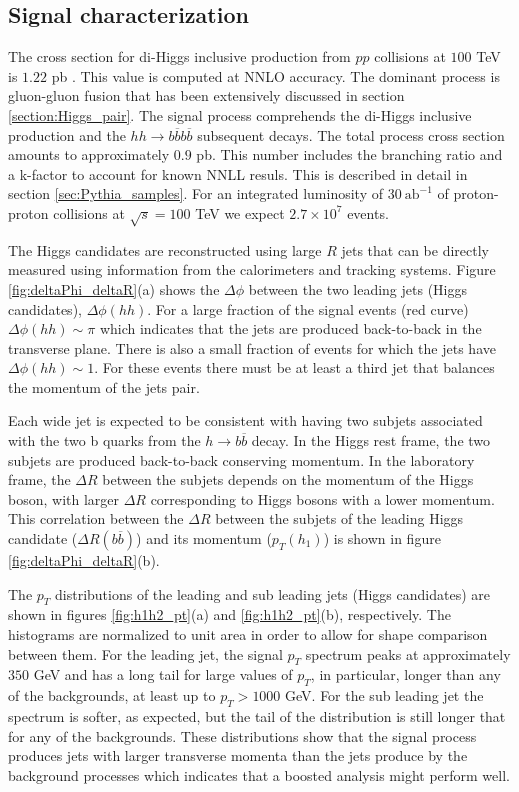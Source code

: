 \subsection{Signal characterization}

The cross section for di-Higgs inclusive production from $pp$ collisions at $100$ TeV is $1.22$ pb \cite{HxsNNLO}. This value is computed at NNLO accuracy. The dominant process is gluon-gluon fusion that has been extensively discussed in section \ref{section:Higgs_pair}. The signal process comprehends the di-Higgs inclusive production and the $hh\rightarrow b\overline{b}b\overline{b}$ subsequent decays. The total process cross section amounts to approximately $0.9$ pb. This number includes the branching ratio and a k-factor to account for known NNLL resuls. This is described in detail in section \ref{sec:Pythia_samples}. For an integrated luminosity of $30~\text{ab}^{-1}$ of proton-proton collisions at $\sqrt{s}=100$ TeV we expect $2.7\times 10^{7}$ events.

The Higgs candidates are reconstructed using large $R$ jets that can be directly measured using information from the calorimeters and tracking systems. Figure \ref{fig:deltaPhi_deltaR}(a) shows the $\Delta\phi$ between the two leading jets (Higgs candidates), $\Delta\phi(hh)$. For a large fraction of the signal events (red curve) $\Delta\phi(hh)\sim \pi$ which indicates that the jets are produced back-to-back in the transverse plane. There is also a small fraction of events for which the jets have $\Delta\phi(hh)\sim 1$. For these events there must be at least a third jet that balances the momentum of the jets pair. 

Each wide jet is expected to be consistent with having two subjets associated with the two b quarks from the $h\rightarrow b\overline{b}$ decay. In the Higgs rest frame, the two subjets are produced back-to-back conserving momentum. In the laboratory frame, the $\Delta R$ between the subjets depends on the momentum of the Higgs boson, with larger $\Delta R$ corresponding to Higgs bosons with a lower momentum. This correlation between the $\Delta R$ between the subjets of the leading Higgs candidate ($\Delta R(b\overline{b})$) and its momentum ($p_T(h_1)$) is shown in figure \ref{fig:deltaPhi_deltaR}(b). 

The $p_T$ distributions of the leading and sub leading jets (Higgs candidates) are shown in figures \ref{fig:h1h2_pt}(a) and \ref{fig:h1h2_pt}(b), respectively. The histograms are normalized to unit area in order to allow for shape comparison between them. For the leading jet, the signal $p_T$ spectrum peaks at approximately $350$ GeV and has a long tail for large values of $p_T$, in particular, longer than any of the backgrounds, at least up to $p_T>1000$ GeV. For the sub leading jet the spectrum is softer, as expected, but the tail of the distribution is still longer that for any of the backgrounds. These distributions show that the signal process produces jets with larger transverse momenta than the jets produce by the background processes which indicates that a boosted analysis might perform well.

